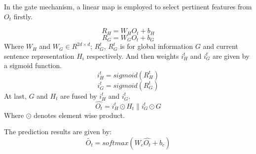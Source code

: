 \documentclass[lettersize,journal]{IEEEtran}
\begin{document}
\begin{table*}[]
\centering
{}
\caption{Result on NER. \label{tab:table2}}
\end{table*}
In the gate mechanism, a linear map is employed to select pertinent features from $O_t$ firstly.

\begin{equation}
R_H = W_HO_t + b_H
\end{equation}
\begin{equation}
R_G = W_GO_t + b_G
\end{equation}
Where $W_H$ and $W_G \in R^{2d×d}$; $R_G^t$, $R_G^t$ is for global information $G$ and current sentence representation $H_i$ respectively. 
And then weights $i_H^t$ and $i_G^t$ are given by a sigmoid function.
\begin{equation}
i_H^t = sigmoid(R_H^t)
\end{equation}
\begin{equation}
i_G^t = sigmoid(R_G^t)
\end{equation}
At last, $G$ and $H_t$ are fused by $i_H^t$ and $i_G^t$.
\begin{equation}
\hat{O_t} = i_H^t \odot H_t \parallel i_G^t \odot G
\end{equation}
Where $\odot$ denotes element wise product.

The prediction results are given by:
\begin{equation}
\tilde{O_t} = softmax(W_c\hat{O_t}+b_c)
\end{equation}
\end{document}
